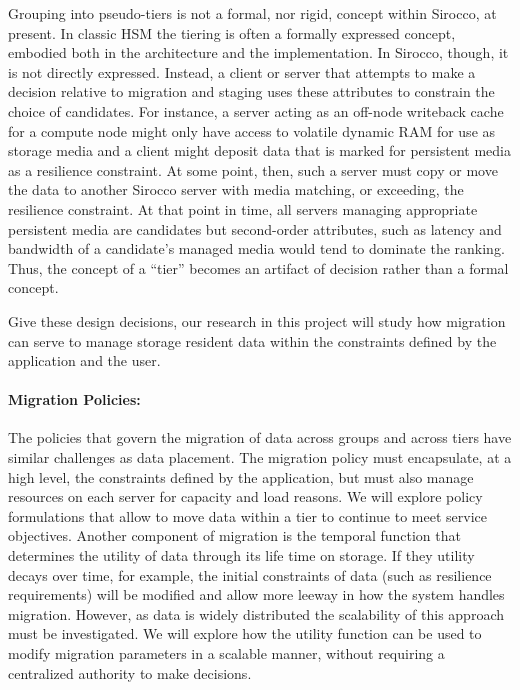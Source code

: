 Grouping into pseudo-tiers is not a formal, nor rigid, concept within
Sirocco, at present. In classic HSM the tiering is often a formally
expressed concept, embodied both in the architecture and the implementation.
In Sirocco, though, it is not directly expressed. Instead, a client or
server that attempts to make a decision relative to migration and staging
uses these attributes to constrain the choice of candidates. For instance, a
server acting as an off-node writeback cache for a compute node might only
have access to volatile dynamic RAM for use as storage media and a client
might deposit data that is marked for persistent media as a resilience
constraint. At some point, then, such a server must copy or move the data to
another Sirocco server with media matching, or exceeding, the resilience
constraint. At that point in time, all servers managing appropriate
persistent media are candidates but second-order attributes, such as latency
and bandwidth of a candidate's managed media would tend to dominate the
ranking. Thus, the concept of a ``tier'' becomes an artifact of decision
rather than a formal concept.

Give these design decisions, our research in this project will study how
migration can serve to manage storage resident data within the constraints
defined by the application and the user. 

\paragraph{Migration Policies:}
The policies that govern the migration of data across groups and across
tiers have similar challenges as data placement. The migration
policy must encapsulate, at a high level, the constraints defined by the
application, but must also manage resources on each server for capacity and
load reasons. We will explore policy formulations that allow \Sir to move
data within a tier to continue to meet service objectives. Another component
of migration is the temporal function that determines the utility of data
through its life time on storage. If they utility decays over time, for
example, the initial constraints of data (such as resilience requirements)
will be modified and allow more leeway in how the system handles migration.
However, as data is widely distributed the scalability of this approach must
be investigated. 
We will explore how the utility function can be used to modify migration
parameters in a scalable manner, without requiring a centralized authority
to make decisions. 

